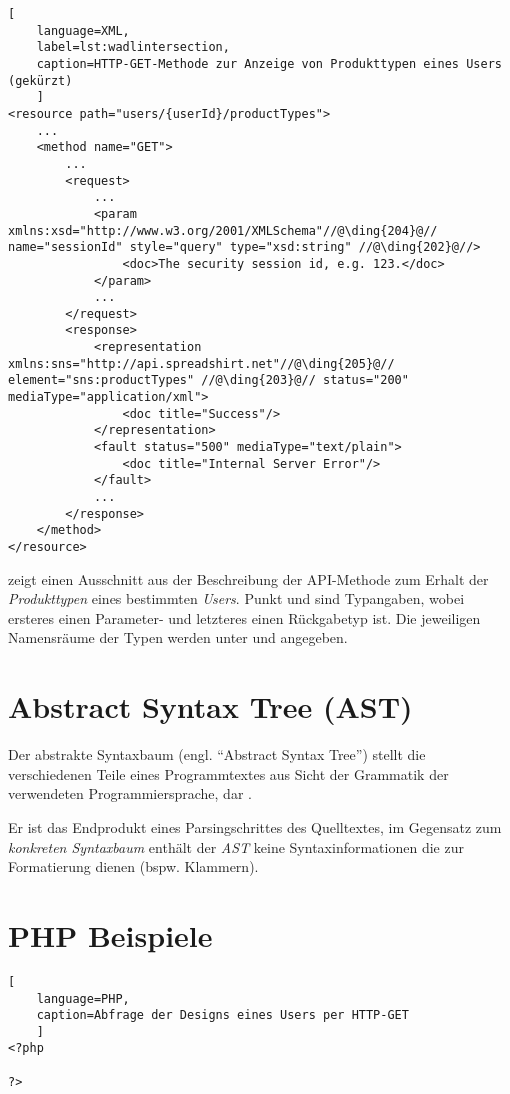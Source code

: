 \begin{lstlisting}[
    language=XML,
    label=lst:wadlintersection,
    caption=HTTP-GET-Methode zur Anzeige von Produkttypen eines Users (gekürzt)
    ]
<resource path="users/{userId}/productTypes">
    ...
    <method name="GET">
        ...
        <request>
            ...
            <param xmlns:xsd="http://www.w3.org/2001/XMLSchema"//@\ding{204}@// name="sessionId" style="query" type="xsd:string" //@\ding{202}@//>
                <doc>The security session id, e.g. 123.</doc>
            </param>
            ...
        </request>
        <response>
            <representation xmlns:sns="http://api.spreadshirt.net"//@\ding{205}@// element="sns:productTypes" //@\ding{203}@// status="200" mediaType="application/xml">
                <doc title="Success"/>
            </representation>
            <fault status="500" mediaType="text/plain">
                <doc title="Internal Server Error"/>
            </fault>
            ...
        </response>
    </method>
</resource>
\end{lstlisting}

 zeigt einen Ausschnitt aus der Beschreibung der API-Methode zum Erhalt der \emph{Produkttypen} eines bestimmten \emph{Users}. Punkt  und  sind Typangaben, wobei ersteres einen Parameter- und letzteres einen Rückgabetyp ist. Die jeweiligen Namensräume der Typen werden unter  und  angegeben.


\section{Abstract Syntax Tree (AST)}

\begin{thesisDefinition}
Der abstrakte Syntaxbaum (engl. \enquote{Abstract Syntax Tree}) stellt die verschiedenen Teile eines Programmtextes aus Sicht der Grammatik der verwendeten Programmiersprache, dar \cite[][S. 9 ff.]{gruneCompiler}.
\end{thesisDefinition}
Er ist das Endprodukt eines Parsingschrittes des Quelltextes, im Gegensatz zum \emph{konkreten Syntaxbaum} enthält der \emph{AST} keine Syntaxinformationen die zur Formatierung dienen (bspw. Klammern). 

\section{PHP Beispiele}

\begin{lstlisting}[
    language=PHP,
    caption=Abfrage der Designs eines Users per HTTP-GET
    ]
<?php

?>
\end{lstlisting}
